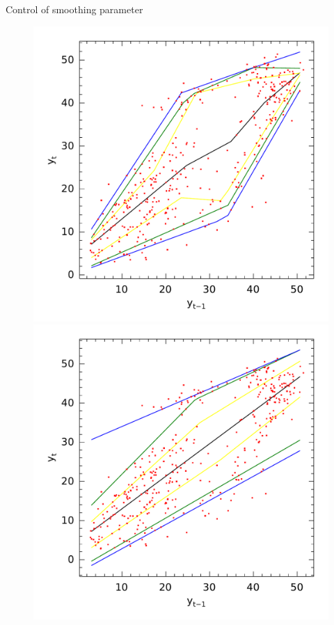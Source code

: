 \documentclass[11pt]{beamer}
\begin{document}
\begin{frame}{Control of smoothing parameter}

\begin{figure}
\centering
\begin{minipage}[t]{\linewidth}
\centering
\begin{minipage}[t]{0.45\linewidth}
\centering     \includegraphics[width=\textwidth]{../Figuras/npqar/icaraizinho-crossing-10}
\end{minipage}
\begin{minipage}[t]{0.45\linewidth}
\centering     \includegraphics[width=\textwidth]{../Figuras/npqar/icaraizinho-crossing-100}
\end{minipage}
\end{minipage}
\end{figure}


\end{frame}
\end{document}
